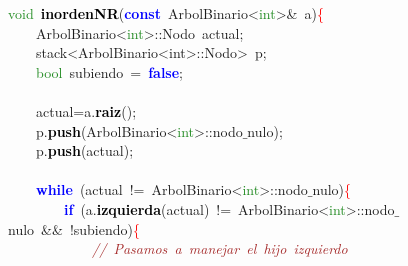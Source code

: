\noindent
\mbox{}\textcolor{ForestGreen}{void}\ \textbf{\textcolor{Black}{inordenNR}}\textcolor{BrickRed}{(}\textbf{\textcolor{Blue}{const}}\ ArbolBinario\textcolor{BrickRed}{\textless{}}\textcolor{ForestGreen}{int}\textcolor{BrickRed}{\textgreater{}\&}\ a\textcolor{BrickRed}{)}\textcolor{Red}{\{} \\
\mbox{}\ \ \ \ ArbolBinario\textcolor{BrickRed}{\textless{}}\textcolor{ForestGreen}{int}\textcolor{BrickRed}{\textgreater{}::}\textcolor{TealBlue}{Nodo}\ actual\textcolor{BrickRed}{;} \\
\mbox{}\ \ \ \ \textcolor{TealBlue}{stack\textless{}ArbolBinario\textless{}int\textgreater{}::Nodo\textgreater{}}\ p\textcolor{BrickRed}{;} \\
\mbox{}\ \ \ \ \textcolor{ForestGreen}{bool}\ subiendo\ \textcolor{BrickRed}{=}\ \textbf{\textcolor{Blue}{false}}\textcolor{BrickRed}{;}\ \ \ \  \\
\mbox{} \\
\mbox{}\ \ \ \ actual\textcolor{BrickRed}{=}a\textcolor{BrickRed}{.}\textbf{\textcolor{Black}{raiz}}\textcolor{BrickRed}{();} \\
\mbox{}\ \ \ \ p\textcolor{BrickRed}{.}\textbf{\textcolor{Black}{push}}\textcolor{BrickRed}{(}ArbolBinario\textcolor{BrickRed}{\textless{}}\textcolor{ForestGreen}{int}\textcolor{BrickRed}{\textgreater{}::}nodo$\_$nulo\textcolor{BrickRed}{);} \\
\mbox{}\ \ \ \ p\textcolor{BrickRed}{.}\textbf{\textcolor{Black}{push}}\textcolor{BrickRed}{(}actual\textcolor{BrickRed}{);} \\
\mbox{}\ \ \ \  \\
\mbox{}\ \ \ \ \textbf{\textcolor{Blue}{while}}\ \textcolor{BrickRed}{(}actual\ \textcolor{BrickRed}{!=}\ ArbolBinario\textcolor{BrickRed}{\textless{}}\textcolor{ForestGreen}{int}\textcolor{BrickRed}{\textgreater{}::}nodo$\_$nulo\textcolor{BrickRed}{)}\textcolor{Red}{\{} \\
\mbox{}\ \ \ \ \ \ \ \ \textbf{\textcolor{Blue}{if}}\ \textcolor{BrickRed}{(}a\textcolor{BrickRed}{.}\textbf{\textcolor{Black}{izquierda}}\textcolor{BrickRed}{(}actual\textcolor{BrickRed}{)}\ \textcolor{BrickRed}{!=}\ ArbolBinario\textcolor{BrickRed}{\textless{}}\textcolor{ForestGreen}{int}\textcolor{BrickRed}{\textgreater{}::}nodo$\_$nulo\ \textcolor{BrickRed}{\&\&}\ \textcolor{BrickRed}{!}subiendo\textcolor{BrickRed}{)}\textcolor{Red}{\{} \\
\mbox{}\ \ \ \ \ \ \ \ \ \ \ \ \textit{\textcolor{Brown}{//\ Pasamos\ a\ manejar\ el\ hijo\ izquierdo}} \\
